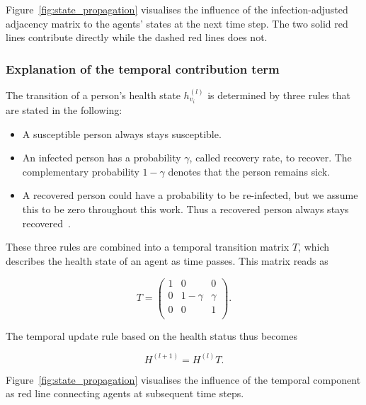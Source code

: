 Figure~\ref{fig:state_propagation} visualises the influence of the infection-adjusted adjacency matrix to the agents' states at the next time step. The two solid red lines contribute directly while the dashed red lines does not.

\subsubsection{Explanation of the temporal contribution term}

The transition of a person's health state $h_{v_i}^{(l)}$ is determined by three rules that are stated in the following:

\begin{itemize}
	\item A susceptible person always stays susceptible.
	\item An infected person has a probability $\gamma$, called recovery rate, to recover. The complementary probability $1-\gamma$ denotes that the person remains sick.
	\item A recovered person could have a probability to be re-infected, but we assume this to be zero throughout this work. Thus a recovered person always stays recovered~\cite{Bao2020.03.13.990226}.
\end{itemize}

These three rules are combined into a temporal transition matrix $T$, which describes the health state of an agent as time passes. This matrix reads as

\begin{equation}
	T = 
	\begin{pmatrix}
		1 &     0    & 0      \\
		0 & 1-\gamma & \gamma \\
		0 &     0    & 1      \\
	\end{pmatrix}.
\end{equation}

The temporal update rule based on the health status thus becomes

\begin{equation}
	H^{(l+1)} = H^{(l)} T.
\end{equation}

Figure~\ref{fig:state_propagation} visualises the influence of the temporal component as red line connecting agents at subsequent time steps.